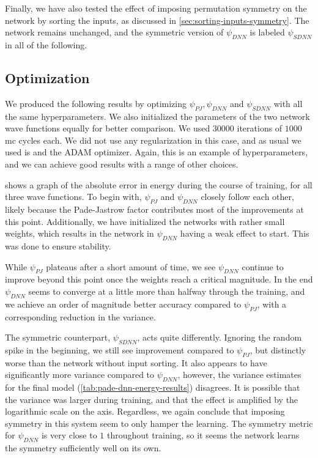 \documentclass[Thesis.tex]{subfiles}
\begin{document}
Finally, we have also tested the effect of imposing permutation symmetry on the
network by sorting the inputs, as discussed in
\cref{sec:sorting-inputs-symmetry}. The network remains unchanged, and the
symmetric version of $\psi_{DNN}$ is labeled $\psi_{SDNN}$ in all of the following.


\subsection{Optimization}

We produced the following results by optimizing $\psi_{PJ}, \psi_{DNN}$ and
$\psi_{SDNN}$ with all the same hyperparameters. We also initialized the
parameters of the two network wave functions equally for better comparison.
We used $\num{30000}$ iterations of $1000$ \gls{mc} cycles each. We did not use any
regularization in this case, and as usual we used \acrlong{is} and the
ADAM optimizer. Again, this is an example of hyperparameters, and we can
achieve good results with a range of other choices.

 shows a graph of the absolute error in energy
during the course of training, for all three wave functions. To begin with,
$\psi_{PJ}$ and $\psi_{DNN}$ closely follow each other,
likely because the Pade-Jastrow factor contributes most of the improvements at
this point. Additionally, we have initialized the networks with rather small
weights, which results in the network in $\psi_{DNN}$ having a weak effect to
start. This was done to ensure stability.

While $\psi_{PJ}$ plateaus after a short amount of time, we see $\psi_{DNN}$
continue to improve beyond this point once the weights reach a critical
magnitude. In the end $\psi_{DNN}$ seems to converge at a little more than
halfway through the training, and we achieve an order of magnitude better
accuracy compared to $\psi_{PJ}$, with a corresponding reduction in the
variance.

The symmetric counterpart, $\psi_{SDNN}$, acts quite differently. Ignoring the
random spike in the beginning, we still see improvement compared to $\psi_{PJ}$,
but distinctly worse than the network without input sorting. It also appears to
have significantly more variance compared to $\psi_{DNN}$, however, the variance
estimates for the final model (\cref{tab:pade-dnn-energy-results}) disagrees. It
is possible that the variance was larger during training, and that the effect is
amplified by the logarithmic scale on the axis. Regardless, we again
conclude that imposing symmetry in this system seem to only hamper the learning.
The symmetry metric for $\psi_{DNN}$ is very close to $1$ throughout training,
so it seems the network learns the symmetry sufficiently well on its own.
\end{document}
